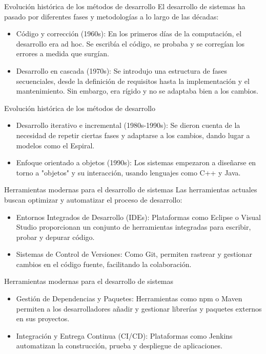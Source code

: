 \documentclass{beamer}
\begin{document}
\begin{frame}{Evolución histórica de los métodos de desarrollo}
El desarrollo de sistemas ha pasado por diferentes fases y metodologías a lo largo de las décadas:

\begin{itemize}
    \item Código y corrección (1960s): En los primeros días de la computación, el desarrollo era ad hoc. Se escribía el código, se probaba y se corregían los errores a medida que surgían.
    \item Desarrollo en cascada (1970s): Se introdujo una estructura de fases secuenciales, desde la definición de requisitos hasta la implementación y el mantenimiento. Sin embargo, era rígido y no se adaptaba bien a los cambios.
\end{itemize}
\end{frame}

\begin{frame}{Evolución histórica de los métodos de desarrollo }
\begin{itemize}
    \item Desarrollo iterativo e incremental (1980s-1990s): Se dieron cuenta de la necesidad de repetir ciertas fases y adaptarse a los cambios, dando lugar a modelos como el Espiral.
    \item Enfoque orientado a objetos (1990s): Los sistemas empezaron a diseñarse en torno a "objetos" y su interacción, usando lenguajes como C++ y Java.
\end{itemize}
\end{frame}

\begin{frame}{Herramientas modernas para el desarrollo de sistemas}
Las herramientas actuales buscan optimizar y automatizar el proceso de desarrollo:

\begin{itemize}
    \item Entornos Integrados de Desarrollo (IDEs): Plataformas como Eclipse o Visual Studio proporcionan un conjunto de herramientas integradas para escribir, probar y depurar código.
    \item Sistemas de Control de Versiones: Como Git, permiten rastrear y gestionar cambios en el código fuente, facilitando la colaboración.
\end{itemize}
\end{frame}

\begin{frame}{Herramientas modernas para el desarrollo de sistemas }
\begin{itemize}
    \item Gestión de Dependencias y Paquetes: Herramientas como npm o Maven permiten a los desarrolladores añadir y gestionar librerías y paquetes externos en sus proyectos.
    \item Integración y Entrega Continua (CI/CD): Plataformas como Jenkins automatizan la construcción, prueba y despliegue de aplicaciones.
\end{itemize}
\end{frame}
\end{document}
